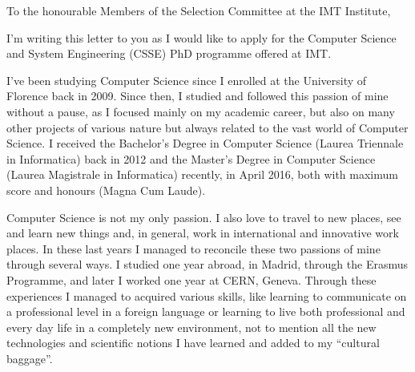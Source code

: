 \documentclass{article}
\begin{document}
    \hspace*{0.5\linewidth}
    
    To the honourable Members of the Selection Committee at the IMT Institute, \par \bigskip
    
    I'm writing this letter to you as I would like to apply for the Computer Science and System
    Engineering (CSSE) PhD programme offered at IMT. \par \bigskip
    
    I've been studying Computer Science since I enrolled at the University of Florence back in 2009. Since then, I studied and followed this passion of mine without a pause, as I focused mainly on my academic career, but also on many other projects of various nature but always related to the vast world of Computer Science. I received the Bachelor's Degree in Computer Science (Laurea Triennale in Informatica) back in 2012 and the Master's Degree in Computer Science (Laurea Magistrale in Informatica) recently, in April 2016, both with maximum score and honours (Magna Cum Laude). \par \bigskip
    
    Computer Science is not my only passion. I also love to travel to new places, see and learn new things and, in general, work in international and innovative work places. In these last years I managed to reconcile these two passions of mine through several ways. I studied one year abroad, in Madrid, through the Erasmus Programme, and later I worked one year at CERN, Geneva. Through these experiences I managed to acquired various skills, like learning to communicate on a professional level in a foreign language or learning to live both professional and every day life in a completely new environment, not to mention all the new technologies and scientific notions I have learned and added to my ``cultural baggage''. \par \bigskip
    
\end{document}
